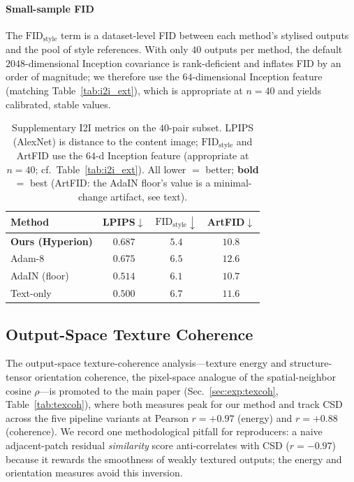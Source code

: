 \paragraph{Small-sample FID}
The $\mathrm{FID}_{\text{style}}$ term is a dataset-level FID between each
method's stylised outputs and the pool of style references. With only $40$
outputs per method, the default $2048$-dimensional Inception covariance is
rank-deficient and inflates FID by an order of magnitude; we therefore use the
$64$-dimensional Inception feature (matching Table~\ref{tab:i2i_ext}), which is
appropriate at $n{=}40$ and yields calibrated, stable values.

\begin{table}[t]
  \centering
  \caption{Supplementary I2I metrics on the $40$-pair subset. LPIPS (AlexNet) is
           distance to the content image; $\mathrm{FID}_{\text{style}}$ and ArtFID
           use the $64$-d Inception feature (appropriate at $n{=}40$;
           cf.\ Table~\ref{tab:i2i_ext}). All lower $=$ better; \textbf{bold} $=$
           best (ArtFID: the AdaIN floor's value is a minimal-change artifact,
           see text).}
  \label{tab:newmetrics_i2i}
  \footnotesize
  \begin{tabular}{lccc}
    \toprule
    Method & LPIPS$\downarrow$ & $\mathrm{FID}_{\text{style}}\downarrow$ & ArtFID$\downarrow$ \\
    \midrule
    \textbf{Ours (Hyperion)} & $0.687$ & $\mathbf{5.4}$ & $10.8$ \\
    Adam-8                 & $0.675$ & $6.5$ & $12.6$ \\
    AdaIN (floor)          & $0.514$ & $6.1$ & $\mathbf{10.7}$ \\
    Text-only              & $0.500$ & $6.7$ & $11.6$ \\
    \bottomrule
  \end{tabular}
\end{table}

\subsection{Output-Space Texture Coherence}
The output-space texture-coherence analysis---texture energy and structure-tensor
orientation coherence, the pixel-space analogue of the spatial-neighbor cosine
$\rho$---is promoted to the main paper (Sec.~\ref{sec:exp:texcoh},
Table~\ref{tab:texcoh}), where both measures peak for our method and track CSD
across the five pipeline variants at Pearson $r{=}{+}0.97$ (energy) and
$r{=}{+}0.88$ (coherence). We record one methodological pitfall for reproducers:
a naive adjacent-patch residual \emph{similarity} score anti-correlates with CSD
($r{=}{-}0.97$) because it rewards the smoothness of weakly textured outputs; the
energy and orientation measures avoid this inversion.

